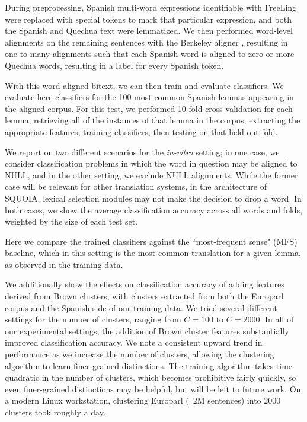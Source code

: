 \documentclass[10pt, a4paper]{article}
\begin{document}
During preprocessing, Spanish multi-word expressions identifiable with FreeLing
were replaced with special tokens to mark that particular expression, and both
the Spanish and Quechua text were lemmatized. We then performed word-level
alignments on the remaining sentences with the Berkeley aligner
\cite{denero-klein:2007:ACLMain}, resulting in one-to-many alignments such that
each Spanish word is aligned to zero or more Quechua words, resulting in a
label for every Spanish token.

With this word-aligned bitext, we can then train and evaluate classifiers.
We evaluate here classifiers for the 100 most common Spanish lemmas appearing
in the aligned corpus. For this test, we performed 10-fold cross-validation for
each lemma, retrieving all of the instances of that lemma in the corpus,
extracting the appropriate features, training classifiers, then testing on
that held-out fold.

We report on two different scenarios for the \emph{in-vitro} setting; in one
case, we consider classification problems in which the word in question may be
aligned to NULL, and in the other setting, we exclude NULL alignments. While
the former case will be relevant for other translation systems, in the
architecture of SQUOIA, lexical selection modules may not make the decision to
drop a word. In both cases, we show the average classification accuracy across
all words and folds, weighted by the size of each test set.

Here we compare the trained classifiers against the ``most-frequent sense"
(MFS) baseline, which in this setting is the most common translation for a
given lemma, as observed in the training data.

We additionally show the effects on classification accuracy of adding features
derived from Brown clusters, with clusters extracted from both the Europarl
corpus and the Spanish side of our training data.
We tried several different
settings for the number of clusters, ranging from $C=100$ to $C=2000$.
In all of our experimental settings, the addition of Brown cluster features
substantially improved classification accuracy. We note a consistent upward
trend in performance as we increase the number of clusters, allowing the
clustering algorithm to learn finer-grained distinctions.
The training algorithm takes time quadratic in the number of clusters,
which becomes prohibitive fairly quickly, so even finer-grained distinctions
may be helpful, but will be left to future work. On a modern Linux
workstation, clustering Europarl (~2M sentences) into 2000 clusters took
roughly a day.
\end{document}
